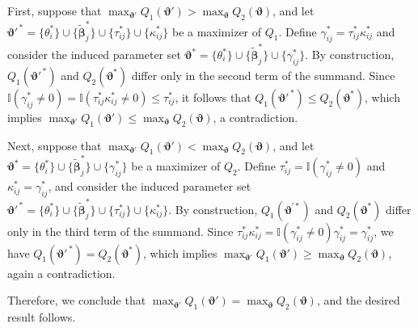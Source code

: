 \documentclass[11pt]{article}
\begin{document}
\vspace{-0.7mm}
First, suppose that $\max_{\boldsymbol{\vartheta}'} Q_1(\boldsymbol{\vartheta}') > \max_{\boldsymbol{\vartheta}} Q_2(\boldsymbol{\vartheta})$, and let $\boldsymbol{\vartheta}'^{\,*} = \{\theta_i^*\} \cup \{\boldsymbol{\tilde{\beta}}_j^*\} \cup \{\tau_{ij}^*\} \cup \{\kappa_{ij}^*\}$ be a maximizer of $Q_1$.  
Define $\gamma_{ij}^* = \tau_{ij}^* \kappa_{ij}^*$ and consider the induced parameter set $\boldsymbol{\vartheta}^* = \{\theta_i^*\} \cup \{\boldsymbol{\tilde{\beta}}_j^*\} \cup \{\gamma_{ij}^*\}$.  
By construction, $Q_1(\boldsymbol{\vartheta}'^{\,*})$ and $Q_2(\boldsymbol{\vartheta}^*)$ differ only in the second term of the summand.  
Since $\mathbb{I}(\gamma_{ij}^* \neq 0) = \mathbb{I}(\tau_{ij}^*\kappa_{ij}^*\neq 0) \le \tau_{ij}^*$, it follows that $Q_1(\boldsymbol{\vartheta}'^{\,*}) \le Q_2(\boldsymbol{\vartheta}^*)$, which implies $\max_{\boldsymbol{\vartheta}'} Q_1(\boldsymbol{\vartheta}') \le \max_{\boldsymbol{\vartheta}} Q_2(\boldsymbol{\vartheta})$, a contradiction.

Next, suppose that $\max_{\boldsymbol{\vartheta}'} Q_1(\boldsymbol{\vartheta}') < \max_{\boldsymbol{\vartheta}} Q_2(\boldsymbol{\vartheta})$, and let $\boldsymbol{\vartheta}^* = \{\theta_i^*\} \cup \{\boldsymbol{\tilde{\beta}}_j^*\} \cup \{\gamma_{ij}^*\}$ be a maximizer of $Q_2$.  
Define $\tau_{ij}^* = \mathbb{I}(\gamma_{ij}^*\neq 0)$ and $\kappa_{ij}^* = \gamma_{ij}^*$, and consider the induced parameter set $\boldsymbol{\vartheta}'^{\,*} = \{\theta_i^*\} \cup \{\boldsymbol{\tilde{\beta}}_j^*\} \cup \{\tau_{ij}^*\} \cup \{\kappa_{ij}^*\}$.  
By construction, $Q_1(\boldsymbol{\vartheta}^{\prime *})$ and $Q_2(\boldsymbol{\vartheta}^*)$ differ only in the third term of the summand. Since $\tau_{ij}^* \kappa_{ij}^* = \mathbb{I}(\gamma_{ij}^*\neq 0)\gamma_{ij}^* = \gamma_{ij}^*$, we have $Q_1(\boldsymbol{\vartheta}'^{\,*}) = Q_2(\boldsymbol{\vartheta}^*)$, which implies $\max_{\boldsymbol{\vartheta}'} Q_1(\boldsymbol{\vartheta}') \ge \max_{\boldsymbol{\vartheta}} Q_2(\boldsymbol{\vartheta})$, again a contradiction.

Therefore, we conclude that $\max_{\boldsymbol{\vartheta}'} Q_1(\boldsymbol{\vartheta}') = \max_{\boldsymbol{\vartheta}} Q_2(\boldsymbol{\vartheta})$, and the desired result follows.


\end{document}

